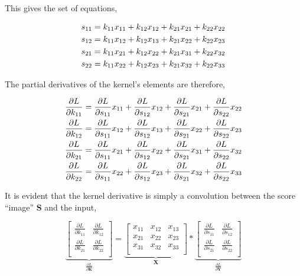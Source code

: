 This gives the set of equations,

\begin{align}
s_{11} &= k_{11}x_{11} + k_{12}x_{12} + k_{21}x_{21} + k_{22}x_{22}\notag \\
s_{12} &= k_{11}x_{12} + k_{12}x_{13} + k_{21}x_{22} + k_{22}x_{23}\notag \\
s_{21} &= k_{11}x_{21} + k_{12}x_{22} + k_{21}x_{31} + k_{22}x_{32}\notag \\
s_{22} &= k_{11}x_{22} + k_{12}x_{23} + k_{21}x_{32} + k_{22}x_{33}\notag
\end{align}

The partial derivatives of the kernel's elements are therefore,

\begin{align}
\frac{\partial{L}}{\partial{k_{11}}} &= \frac{\partial{L}}{\partial{s_{11}}}x_{11} + \frac{\partial{L}}{\partial{s_{12}}}x_{12} + \frac{\partial{L}}{\partial{s_{21}}}x_{21} + \frac{\partial{L}}{\partial{s_{22}}}x_{22}\notag \\
\frac{\partial{L}}{\partial{k_{12}}} &= \frac{\partial{L}}{\partial{s_{11}}}x_{12} + \frac{\partial{L}}{\partial{s_{12}}}x_{13} + \frac{\partial{L}}{\partial{s_{21}}}x_{22} + \frac{\partial{L}}{\partial{s_{22}}}x_{23}\notag \\
\frac{\partial{L}}{\partial{k_{21}}} &= \frac{\partial{L}}{\partial{s_{11}}}x_{21} + \frac{\partial{L}}{\partial{s_{12}}}x_{22} + \frac{\partial{L}}{\partial{s_{21}}}x_{31} + \frac{\partial{L}}{\partial{s_{22}}}x_{32}\notag \\
\frac{\partial{L}}{\partial{k_{22}}} &= \frac{\partial{L}}{\partial{s_{11}}}x_{22} + \frac{\partial{L}}{\partial{s_{12}}}x_{23} + \frac{\partial{L}}{\partial{s_{21}}}x_{32} + \frac{\partial{L}}{\partial{s_{22}}}x_{33}\notag
\end{align}

It is evident that the kernel derivative is simply a convolution between the score ``image'' $\mathbf{S}$ and the input,

$$
\underbrace{\begin{bmatrix}
\frac{\partial{L}}{\partial{k_{11}}} & \frac{\partial{L}}{\partial{k_{12}}} \\
\frac{\partial{L}}{\partial{k_{21}}} & \frac{\partial{L}}{\partial{k_{22}}} \\
\end{bmatrix}}_{\frac{\partial L}{\partial\mathbf{K}}}
=
\underbrace{\begin{bmatrix}
x_{11} & x_{12} & x_{13} \\
x_{21} & x_{22} & x_{23} \\
x_{31} & x_{32} & x_{33} \\
\end{bmatrix}}_{\mathbf{X}} *
\underbrace{\begin{bmatrix}
\frac{\partial{L}}{\partial{s_{11}}} & \frac{\partial{L}}{\partial{s_{12}}} \\
\frac{\partial{L}}{\partial{s_{21}}} & \frac{\partial{L}}{\partial{s_{22}}} \\
\end{bmatrix}}_{\frac{\partial L}{\partial\mathbf{Y}}}
$$

